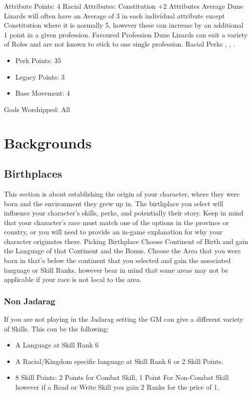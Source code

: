 \documentclass[12pt]{article}
\begin{document}
\begin{multicols}{2}
\begin{itemize}
\end{itemize}
Attribute Points: 4
Racial Attributes: Constitution +2
Attributes Average
Dune Lizards will often have an Average of 3 in each individual attribute except Constitution where it is normally 5, however these can increase by an additional 1 point in a given profession.
Favoured Profession
Dune Lizards can suit a variety of Roles and are not known to stick to one single profession.
Racial Perks
, , .
\begin{itemize}
\item Perk Points: 35
\item Legacy Points: 3
\item Base Movement: 4
\end{itemize}
Gods Worshipped: All
\end{multicols}
\newpage
\section{Backgrounds}
\subsection{Birthplaces}
This section is about establishing the origin of your character, where they were born and the environment they grew up in. The birthplace you select will influence your character's skills, perks, and potentially their story. Keep in mind that your character's race must match one of the options in the province or country, or you will need to provide an in-game explanation for why your character originates there.
Picking Birthplace
Choose Continent of Birth and gain the Language of that Continent and the Bonus.
Choose the Area that you were born in that's below the continent that you selected and gain the associated language or Skill Ranks, however bear in mind that some areas may not be applicable if your race is not local to the area.
\subsubsection{Non Jadarag}
If you are not playing in the Jadarag setting the GM can give a different variety of Skills. This can be the following:
\begin{itemize}
\item A Language at Skill Rank 6
\item A Racial/Kingdom specific language at Skill Rank 6 or 2 Skill Points.
\item 8 Skill Points: 2 Points for Combat Skill, 1 Point For Non-Combat Skill however if a Read or Write Skill you gain 2 Ranks for the price of 1.
\end{itemize}
\end{document}
